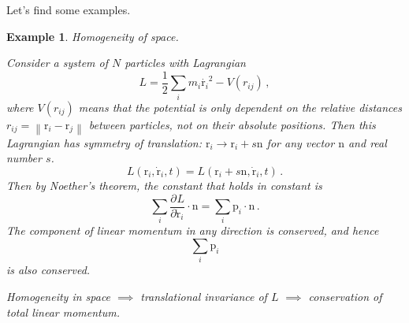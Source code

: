 \documentclass{article}
\theoremstyle{plain}\theoremheaderfont{\normalfont\itshape}\theorembodyfont{\rmfamily}\theoremseparator{.}\newtheorem*{rem}{Remark}\newtheorem*{ex}{Example}\newtheorem*{proof}{Proof}\newtheorem*{altp}{Alternative proof}
\theoremstyle{plain}\theoremheaderfont{\normalfont\bfseries}\theorembodyfont{\rmfamily}\theoremseparator{.}\newtheorem{thm}{Theorem}[section]\newtheorem{lem}[thm]{Lemma}\newtheorem{prop}[thm]{Proposition}\newtheorem*{cor}{Corollary}\newtheorem{defn}[thm]{Definition}\newtheorem{clm}[thm]{Claim}\newtheorem{clminproof}{Claim}\newtheorem*{law}{Law}\newtheorem{pos}[thm]{Postulate}
\theoremstyle{break}\theoremheaderfont{\normalfont\itshape}\theorembodyfont{\rmfamily}\theoremseparator{.\medskip}\newtheorem*{proofskip}{Proof}\newtheorem*{exs}{Examples}\newtheorem*{rems}{Remarks}
\theoremstyle{break}\theoremheaderfont{\normalfont\bfseries}\theorembodyfont{\rmfamily}\theoremseparator{.\medskip}\newtheorem{lemskip}[thm]{Lemma}\newtheorem{defnskip}[thm]{Definition}\newtheorem{propskip}[thm]{Proposition}\newtheorem{thmskip}[thm]{Theorem}
\numberwithin{equation}{section}
\newcommand{\pdv}[3][]{\frac{\partial^{#1} #2}{{\partial #3}^{#1}}}
\newcommand{\vb}[1]{\bm{\mathrm{#1}}}
\newcommand{\vdot}{\,\bm{\mathrm{\cdot}}\,}
\newcommand{\norm}[1]{\left\| #1 \right\|}
\begin{document}
    Let's find some examples.
    \begin{ex}
        \textit{Homogeneity of space}.

        Consider a system of \(N\) particles with Lagrangian
        \begin{equation}
            L=\frac{1}{2}\sum_i m_i\dot{\vb{r}_i}^2-V(r_{ij})\,,
        \end{equation}
        where \(V(r_{ij})\) means that the potential is only dependent on the relative distances \(r_{ij}=\norm{\vb{r}_i-\vb{r}_j}\) between particles, not on their absolute positions. Then this Lagrangian has symmetry of translation: \(\vb{r}_i\to\vb{r}_i+s\vb{n}\) for any vector \(\vb{n}\) and real number \(s\).
        \begin{equation}
            L(\vb{r}_i,\dot{\vb{r}}_i,t)=L(\vb{r}_i+s\vb{n},\dot{\vb{r}}_i,t)\,.
        \end{equation}
        Then by Noether's theorem, the constant that holds in constant is
        \begin{equation}
            \sum_i\pdv{L}{\dot{\vb{r}}_i}\vdot\vb{n}=\sum_i\vb{p}_i\vdot\vb{n}\,.
        \end{equation}
        The component of linear momentum in any direction is conserved, and hence
        \begin{equation}
            \sum_i\vb{p}_i
        \end{equation}
        is also conserved.

        Homogeneity in space \(\implies\) translational invariance of \(L\) \(\implies\) conservation of total linear momentum.
    \end{ex}
\end{document}
